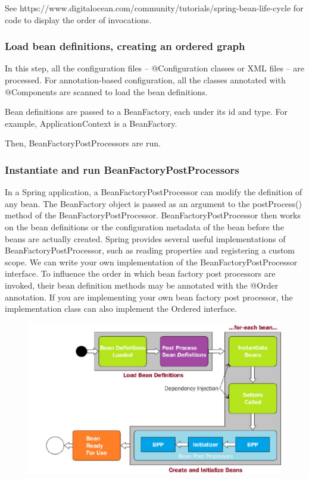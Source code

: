 \documentclass{scrartcl}
\begin{document}
See https://www.digitalocean.com/community/tutorials/spring-bean-life-cycle for code to display the order of invocations.

\subsubsection{Load bean definitions, creating an ordered graph}
In this step, all the configuration files – @Configuration classes or XML files – are processed. For annotation-based configuration, all the classes annotated with @Components are scanned to load the bean definitions.

Bean definitions are passed to a BeanFactory, each under its id and type. For example, ApplicationContext is a BeanFactory.

Then, BeanFactoryPostProcessors are run.

\subsubsection{Instantiate and run BeanFactoryPostProcessors}
In a Spring application, a BeanFactoryPostProcessor can modify the definition of any bean.
The BeanFactory object is passed as an argument to the postProcess() method of the BeanFactoryPostProcessor. BeanFactoryPostProcessor then works on the bean definitions or the configuration metadata of the bean before the beans are actually created.
Spring provides several useful implementations of BeanFactoryPostProcessor, such as reading properties and registering a custom scope. We can write your own implementation of the BeanFactoryPostProcessor interface. To influence the order in which bean factory post processors are invoked, their bean definition methods may be annotated with the @Order annotation. If you are implementing your own bean factory post processor, the implementation class can also implement the Ordered interface.

\begin{figure}
    \centering
    \includegraphics[width=1\linewidth]{bean-lifecycle-3}
    \caption{}
    \label{fig:bean-lifecycle-1}
\end{figure}
\end{document}

